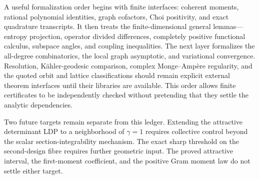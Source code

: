 A useful formalization order begins with finite interfaces: coherent
moments, rational polynomial identities, graph cofactors, Choi positivity,
and exact quadrature transcripts. It then treats the finite-dimensional
general lemmas---entropy projection, operator divided differences,
completely positive functional calculus, subspace angles, and coupling
inequalities. The next layer formalizes the all-degree combinatorics,
the local graph asymptotic, and variational convergence. Resolution,
K\"ahler-geodesic comparison, complex Monge--Amp\`ere regularity, and
the quoted orbit and lattice classifications should remain explicit
external theorem interfaces until their libraries are available.
This order allows finite certificates to be independently checked
without pretending that they settle the analytic dependencies.

Two future targets remain separate from this ledger. Extending the
attractive determinant LDP to a neighborhood of $\gamma=1$ requires
collective control beyond the scalar section-integrability mechanism.
The exact sharp threshold on the second-design fibre requires further
geometric input. The proved attractive interval, the first-moment
coefficient, and the positive Gram moment law do not settle either target.
